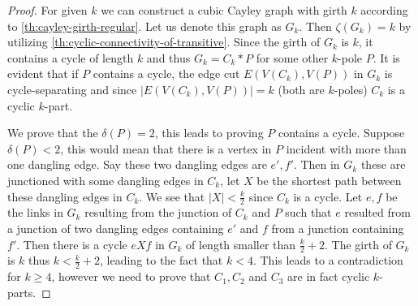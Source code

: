 \documentclass[12pt, twoside]{book}
\begin{document}
\begin{proof}
	For given $k$ we can construct a cubic Cayley graph with girth $k$ according to \cref{th:cayley-girth-regular}. Let us denote this graph as $G_k$. Then $\zeta(G_k)=k$ by utilizing \cref{th:cyclic-connectivity-of-transitive}. Since the girth of $G_k$ is $k$, it contains a cycle of length $k$ and thus $G_k=C_k*P$ for some other $k$-pole $P$. It is evident that if $P$ contains a cycle, the edge cut $E(V(C_k), V(P))$ in $G_k$ is cycle-separating and since $|E(V(C_k), V(P))|=k$ (both are $k$-poles) $C_k$ is a cyclic $k$-part.
	
	We prove that the $\delta(P)=2$, this leads to proving $P$ contains a cycle. Suppose $\delta(P)<2$, this would mean that there is a vertex in $P$ incident with more than one dangling edge. Say these two dangling edges are $e',f'$. Then in $G_k$ these are junctioned with some dangling edges in $C_k$, let $X$ be the shortest path between these dangling edges in $C_k$. We see that $|X|<\frac{k}{2}$ since $C_k$ is a cycle. Let $e,f$ be the links in $G_k$ resulting from the junction of $C_k$ and $P$ such that $e$ resulted from a junction of two dangling edges containing $e'$ and $f$ from a junction containing $f'$. Then there is a cycle $eXf$ in $G_k$ of length smaller than $\frac{k}{2}+2$. The girth of $G_k$ is $k$ thus $k<\frac{k}{2}+2$, leading to the fact that $k<4$. This leads to a contradiction for $k\geq 4$, however we need to prove that $C_1,C_2$ and $C_3$ are in fact cyclic $k$-parts.
	

\end{proof}
\end{document}
